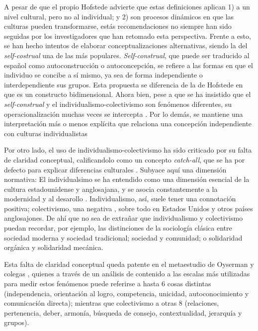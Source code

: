 \documentclass[12pt,twoside]{templates/facsothesis}
\begin{document}
A pesar de que el propio Hofstede advierte que estas definiciones aplican 1) a un nivel cultural, pero no al individual; y 2) son procesos dinámicos en que las culturas pueden transformarse, estás recomendaciones no siempre han sido seguidas por los investigadores que han retomado esta perspectiva. Frente a esto, se han hecho intentos de elaborar conceptualizaciones alternativas, siendo la del \emph{self-costrual} \citep{cross2011} una de las más populares. \emph{Self-construal}, que puede ser traducido al español como autoconstrucción o autoconcepción, se refiere a las formas en que el individuo se concibe a sí mismo, ya sea de forma independiente o interdependiente sus grupos. Esta propuesta se diferencia de la de Hofstede en que es un constructo bidimensional. Ahora bien, pese a que se ha insistido que el \emph{self-construal} y el individualismo-colectivismo son fenómenos diferentes, su operacionalización muchas veces se intercepta \citep{cross2011}. Por lo demás, se mantiene una interpretación más o menos explícita que relaciona una concepción independiente con culturas individualistas \citep{cross2011, voronov2002}

Por otro lado, el uso de individualismo-colectivismo ha sido criticado por su falta de claridad conceptual, calificandolo como un concepto \emph{catch-all}, que se ha por defecto para explicar diferencias culturales \citep{voronov2002}. Subyace aquí una dimensión normativa: El individualsimo se ha entendido como una dimensión esencial de la cultura estadounidense y anglosajana, y se asocia constantemente a la modernidad y al desarollo \citep{voronov2002, wang2010}. Individualismo, así, suele tener una connotación positiva; colectivismo, una negativa \citep{moemeka1998}, sobre todo en Estados Unidos y otros países anglosajones. De ahí que no sea de extrañar que individualismo y colectivismo puedan recordar, por ejemplo, las distinciones de la sociología clásica entre sociedad moderna y sociedad tradicional; sociedad y comunidad; o solidaridad orgánica y solidaridad mecánica.

Esta falta de claridad conceptual queda patente en el metaestudio de Oyserman y colegas \citeyearpar{oyserman2002}, quienes a través de un análisis de contenido a las escalas más utilizadas para medir estos fenómenos puede referirse a hasta 6 cosas distintas (independencia, orientación al logro, competencia, unicidad, autoconocimiento y comunicación directa); mientras que colectivismo a otras 8 (relaciones, pertenencia, deber, armonía, búsqueda de consejo, contextualidad, jerarquía y grupos).
\end{document}
